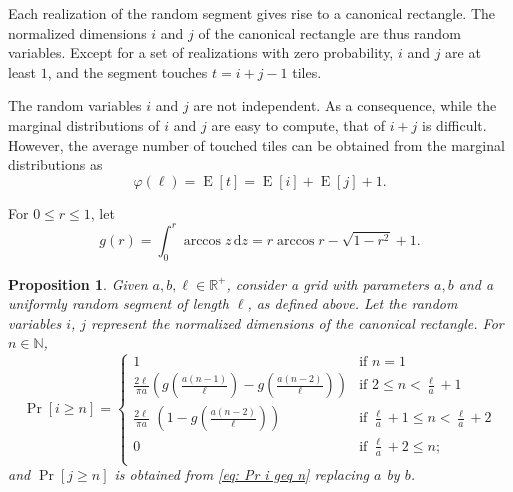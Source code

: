 \documentclass[12pt, a4paper]{article}
\newcommand{\diff}{\,\mathrm d}
\DeclareMathOperator{\E}{E}
\newcommand{\funta}{\varphi} %
\newcommand{\len}{\ell} %
\newcommand{\genvar}{r}
\newtheorem{proposition}{Proposition}%
\begin{document}
Each realization of the random segment gives rise to a canonical rectangle. The normalized dimensions $i$ and $j$ of the canonical rectangle are thus random variables. Except for a set of realizations with zero probability, $i$ and $j$ are at least $1$, and the segment touches $t = i+j-1$ tiles.

The random variables $i$ and $j$ are not independent. As a consequence, while the marginal distributions of $i$ and $j$ are easy to compute, that of $i+j$ is difficult. However, the average number of touched tiles can be obtained from the marginal distributions as
\begin{equation}
\label{eq: funta E[i] E[j]}
\funta(\len) = \E[t] = \E[i]+\E[j]+1.
\end{equation}

For $0 \leq \genvar \leq 1$, let
\begin{equation}
\label{eq: g}
g(\genvar) = \int_0^r \arccos z \diff z = \genvar \arccos \genvar - \sqrt{1-\genvar^2} + 1.
\end{equation}

\begin{proposition}
Given $a, b, \len \in \mathbb R^+$, consider a grid with parameters $a, b$ and a uniformly random segment of length $\len$, as defined above. Let the random variables $i$, $j$ represent the normalized dimensions of the canonical rectangle. For $n \in \mathbb N$,
\begin{equation}
\label{eq: Pr i geq n}
\Pr[i \geq n] = \begin{cases}
\displaystyle
1 &\text{if\ \ } \displaystyle n =1 \\[1 mm]
\displaystyle
\frac{2\len}{\pi a} \left(g\left(\frac{a(n-1)}{\len}\right)-g\left(\frac{a(n-2)}{\len} \right)\right) &\text{if\ \ } \displaystyle 2 \leq n < \frac \len a + 1 \\[4 mm]
\displaystyle
\frac{2\len}{\pi a}\,\, \left(1 - g\left(\frac{a(n-2)}{\len}\right)\right) &\text{if\ \ } \displaystyle \frac\len a + 1 \leq n < \frac\len a+2 \\[3 mm]
\displaystyle
0 &\text{if\ \ } \displaystyle \frac \len a + 2 \leq  n; \\
\end{cases}
\end{equation}
and $\Pr[j \geq n]$ is obtained from \eqref{eq: Pr i geq n} replacing $a$ by $b$.
\end{proposition}
\end{document}
